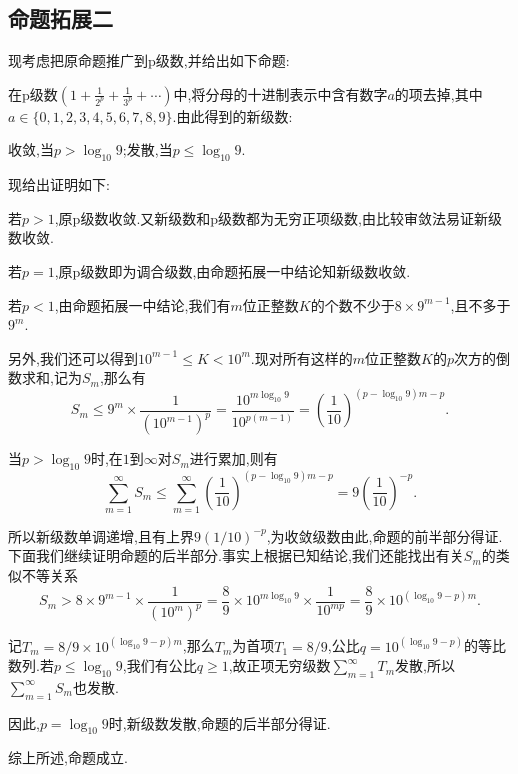 \documentclass[a4paper,12pt]{article}
\begin{document}
\begin{CJK*}{UTF8}{gbsn}
\subsection{命题拓展二}
\noindent 现考虑把原命题推广到p级数,并给出如下命题:\par\vspace{5pt}
在p级数$\displaystyle(1+\frac{1}{2^p}+\frac{1}{3^p}+\cdots)$中,将分母的十进制表示中含有数字$a$的项去掉,其中$a\in\{0,1,2,3,4,5,6,7,8,9\}$.由此得到的新级数:
\begin{center}
收敛,当$p>\log_{10}9$;发散,当$p\leqslant\log_{10}9$.
\end{center}
现给出证明如下:\par\vspace{5pt}
若$p>1$,原p级数收敛.又新级数和p级数都为无穷正项级数,由比较审敛法易证新级数收敛.\par 若$p=1$,原p级数即为调合级数,由命题拓展一中结论知新级数收敛.\par 若$p<1$,由命题拓展一中结论,我们有$m$位正整数$K$的个数不少于$8\times9^{m-1}$,且不多于$9^m$.\par
另外,我们还可以得到$10^{m-1}\leqslant K<10^m$.现对所有这样的$m$位正整数$K$的$p$次方的倒数求和,记为$S_m$,那么有
\begin{equation*}
S_m\leqslant9^m\times\frac{1}{(10^{m-1})^p}=\frac{10^{m\log_{10}9}}{10^{p(m-1)}}=(\frac{1}{10})^{(p-\log_{10}9)m-p}.
\end{equation*}\par
当$p>\log_{10}9$时,在$1$到$\infty$对$S_m$进行累加,则有
\begin{equation*}
\sum_{m=1}^{\infty}S_m\leqslant\sum_{m=1}^{\infty}(\frac{1}{10})^{(p-\log_{10}9)m-p}=9(\frac{1}{10})^{-p}.
\end{equation*}\par
所以新级数单调递增,且有上界$9(1/10)^{-p}$,为收敛级数由此,命题的前半部分得证.下面我们继续证明命题的后半部分.事实上根据已知结论,我们还能找出有关$S_m$的类似不等关系
\begin{equation*}
S_m>8\times9^{m-1}\times\frac{1}{(10^m)^p}=\frac{8}{9}\times10^{m\log_{10}9}\times\frac{1}{10^{mp}}=\frac{8}{9}\times10^{(\log_{10}9-p)m}.
\end{equation*}\par
记$T_m=8/9\times10^{(\log_{10}9-p)m}$,那么$T_m$为首项$T_1=8/9$,公比$q=10^{(\log_{10}9-p)}$的等比数列.若$p\leqslant\log_{10}9$,我们有公比$q\geqslant1$,故正项无穷级数$\sum_{m=1}^{\infty}T_m$发散,所以$\sum_{m=1}^{\infty}S_m$也发散.\par
因此,$p=\log_{10}9$时,新级数发散,命题的后半部分得证.\par
综上所述,命题成立.



\end{CJK*}
\end{document}

